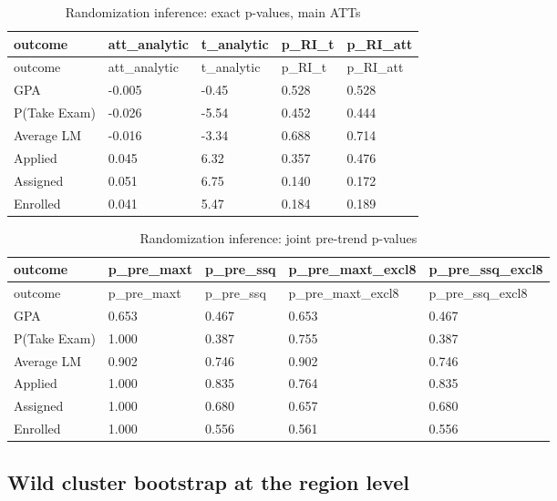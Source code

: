\documentclass[
]{article}
\begin{document}
\begin{longtable}[]{@{}lllll@{}}
\caption{Randomization inference: exact p-values, main
ATTs}\tabularnewline
\toprule
outcome & att\_analytic & t\_analytic & p\_RI\_t & p\_RI\_att \\
\midrule
\endfirsthead
\toprule
outcome & att\_analytic & t\_analytic & p\_RI\_t & p\_RI\_att \\
\midrule
\endhead
GPA & -0.005 & -0.45 & 0.528 & 0.528 \\
P(Take Exam) & -0.026 & -5.54 & 0.452 & 0.444 \\
Average LM & -0.016 & -3.34 & 0.688 & 0.714 \\
Applied & 0.045 & 6.32 & 0.357 & 0.476 \\
Assigned & 0.051 & 6.75 & 0.140 & 0.172 \\
Enrolled & 0.041 & 5.47 & 0.184 & 0.189 \\
\bottomrule
\end{longtable}

\begin{longtable}[]{@{}lllll@{}}
\caption{Randomization inference: joint pre-trend
p-values}\tabularnewline
\toprule
outcome & p\_pre\_maxt & p\_pre\_ssq & p\_pre\_maxt\_excl8 &
p\_pre\_ssq\_excl8 \\
\midrule
\endfirsthead
\toprule
outcome & p\_pre\_maxt & p\_pre\_ssq & p\_pre\_maxt\_excl8 &
p\_pre\_ssq\_excl8 \\
\midrule
\endhead
GPA & 0.653 & 0.467 & 0.653 & 0.467 \\
P(Take Exam) & 1.000 & 0.387 & 0.755 & 0.387 \\
Average LM & 0.902 & 0.746 & 0.902 & 0.746 \\
Applied & 1.000 & 0.835 & 0.764 & 0.835 \\
Assigned & 1.000 & 0.680 & 0.657 & 0.680 \\
Enrolled & 1.000 & 0.556 & 0.561 & 0.556 \\
\bottomrule
\end{longtable}

\hypertarget{wild-cluster-bootstrap-at-the-region-level}{%
\subsection{Wild cluster bootstrap at the region
level}\label{wild-cluster-bootstrap-at-the-region-level}}
\end{document}
